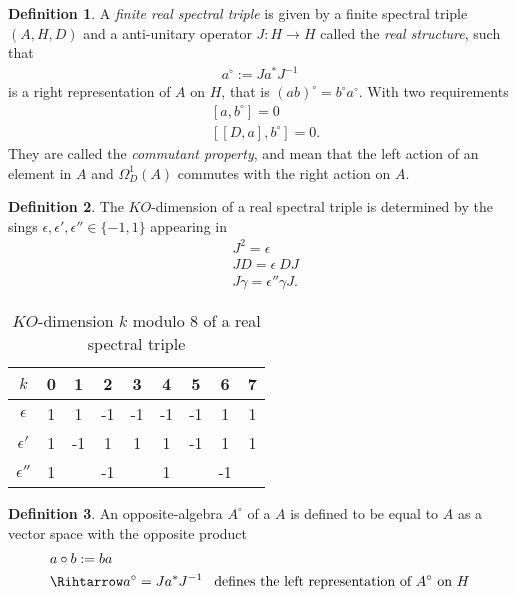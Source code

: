\documentclass[a4paper]{article}
\theoremstyle{definition}
\newtheorem{definition}{Definition}
\theoremstyle{definition}
\theoremstyle{definition}
\theoremstyle{theorem}
\theoremstyle{theorem}
\begin{document}
\begin{definition}
    A \textit{finite real spectral triple} is given by a finite spectral
    triple $(A, H, D)$ and a anti-unitary operator $J:H\rightarrow H$ called
    the \textit{real structure}, such that
    \begin{align}
        a^\circ := J a^* J^{-1}
    \end{align}
    is a right representation of $A$ on $H$, that is $(ab)^\circ = b^\circ
    a^\circ$. With two requirements
    \begin{align}
        &[a, b^\circ] = 0\\
        &[[D, a],b^\circ] = 0.
    \end{align}
    They are called the \textit{commutant property}, and mean that the left
    action of an element in $A$ and $\Omega _D^1(A)$ commutes with the right
    action on $A$.
\end{definition}
\begin{definition}
    The $KO$-dimension of a real spectral triple is determined by the sings
    $\epsilon, \epsilon ' ,\epsilon '' \in \{-1, 1\}$ appearing in
    \begin{align}
        &J^2 = \epsilon \\
        &JD = \epsilon \ DJ\\
        &J\gamma = \epsilon '' \gamma J.
    \end{align}
\end{definition}
\begin{table}[h!]
    \centering
    \caption{$KO$-dimension $k$ modulo $8$ of a real spectral triple}
    \begin{tabular}{ c | c c c c c c c c}
        \hline
        $k$        & 0 & 1 & 2 & 3 & 4 & 5 & 6 & 7 \\
        \hline
     $\epsilon$    & 1 & 1 & -1 & -1 & -1 & -1 & 1 & 1 \\
     $\epsilon '$  & 1 & -1 & 1 & 1 & 1 & -1 & 1 & 1 \\
     $\epsilon ''$ & 1 &  & -1 &  & 1 &  & -1 &  \\
     \hline
    \end{tabular}
\end{table}


\begin{definition}
An opposite-algebra $A^\circ$ of a $A$ is defined to be equal to $A$ as a
vector space with the opposite product
\begin{align}
    &a\circ b := ba\\
    &\Rihtarrow a^\circ = Ja^* J^{-1} \;\;\; \text{defines the left
    representation of $A^\circ$ on $H$}
\end{align}
\end{definition}
\end{document}

